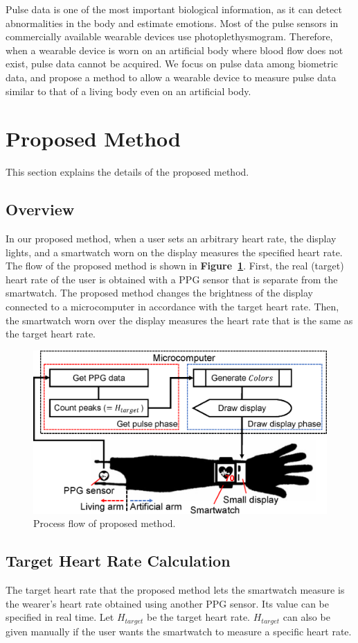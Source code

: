 \documentclass[sigchi,authordraft]{acmart}
\newcommand\figref[1]{\textbf{Figure~\ref{fig:#1}}}
\begin{document}
Pulse data is one of the most important biological information, as it can detect abnormalities in the body and estimate emotions. Most of the pulse sensors in commercially available wearable devices use photoplethysmogram. Therefore, when a wearable device is worn on an artificial body where blood flow does not exist, pulse data cannot be acquired. We focus on pulse data among biometric data, and propose a method to allow a wearable device to measure pulse data similar to that of a living body even on an artificial body.



\section{Proposed Method}
\label{sec:method}
This section explains the details of the proposed method.

\subsection{Overview}
\label{subsec:overview}
In our proposed method, when a user sets an arbitrary heart rate, the display lights, and a smartwatch worn on the display measures the specified heart rate. The flow of the proposed method is shown in \figref{method}. First, the real (target) heart rate of the user is obtained with a PPG sensor that is separate from the smartwatch. The proposed method changes the brightness of the display connected to a microcomputer in accordance with the target heart rate. Then, the smartwatch worn over the display measures the heart rate that is the same as the target heart rate.

\begin{figure}[!t]
  \centering
  \includegraphics[width=0.75\linewidth]{figures/method.eps}
  \caption{Process flow of proposed method.}
  \label{fig:method}
\end{figure}


\subsection{Target Heart Rate Calculation}
The target heart rate that the proposed method lets the smartwatch measure is the wearer's heart rate obtained using another PPG sensor. Its value can be specified in real time. Let $H_{target}$ be the target heart rate. $H_{target}$ can also be given manually if the user wants the smartwatch to measure a specific heart rate.
\end{document}
